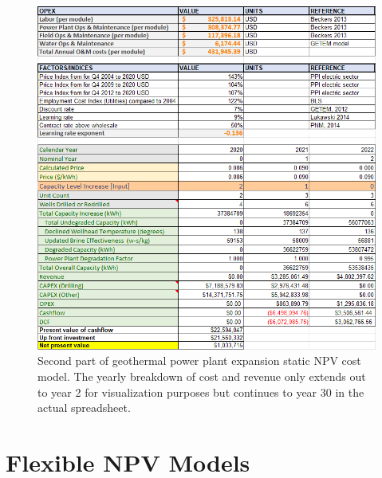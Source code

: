 \begin{figure}[H]
\centering
\includegraphics[width=\textwidth]{templates/images/Figure-Static_Model_SheetB.png}
\caption[Static cost model worksheet (part 2)]{Second part of geothermal power plant expansion static NPV cost model. The yearly breakdown of cost and revenue only extends out to year 2 for visualization purposes but continues to year 30 in the actual spreadsheet.}
\label{fig:static_model_sheet2}
\end{figure}
\pagebreak
\section{Flexible NPV Models}\label{app:B_flex_models}

